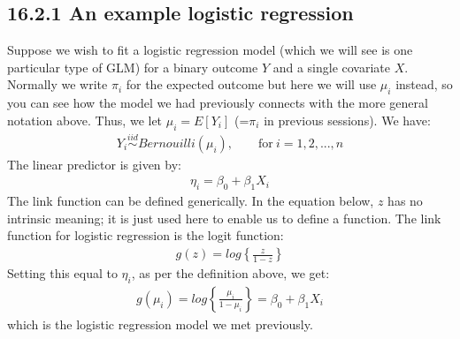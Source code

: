 \documentclass[letterpaper,10pt,english]{jupyterBook}
\begin{document}
\subsection{16.2.1 An example \sphinxhyphen{} logistic regression}
\label{\detokenize{16.c. Generalised Linear Model (GLM):an-example-logistic-regression}}
\sphinxAtStartPar
Suppose we wish to fit a logistic regression model (which we will see is one particular type of GLM) for a binary outcome \(Y\) and a single covariate \(X\). Normally we write \(\pi_i\) for the expected outcome but here we will use \(\mu_i\) instead, so you can see how the model we had previously connects with the more general notation above. Thus, we let \(\mu_i = E[Y_i]\) (=\(\pi_i\) in previous sessions). We have:
\begin{equation*}
\begin{split}
Y_i \overset{iid}{\sim} Bernouilli(\mu_i), \qquad \text{for} \ i=1, 2, ..., n
\end{split}
\end{equation*}
\sphinxAtStartPar
The linear predictor is given by:
\begin{equation*}
\begin{split}
\eta_i = \beta_0 + \beta_1 X_i 
\end{split}
\end{equation*}
\sphinxAtStartPar
The link function can be defined generically. In the equation below, \(z\) has no intrinsic meaning; it is just used here to enable us to define a function. The link function for logistic regression is the logit function:
\begin{equation*}
\begin{split}
g(z) = log \left\{ \frac{z}{1-z} \right\}
\end{split}
\end{equation*}
\sphinxAtStartPar
Setting this equal to \(\eta_i\), as per the definition above, we get:
\begin{equation*}
\begin{split}
g(\mu_i) = log \left\{ \frac{\mu_i}{1-\mu_i} \right\} = \beta_0 + \beta_1 X_i 
\end{split}
\end{equation*}
\sphinxAtStartPar
which is the logistic regression model we met previously.
\end{document}

